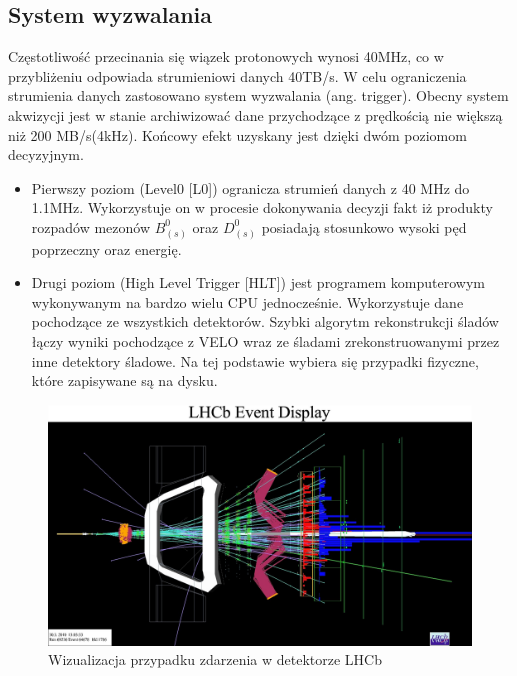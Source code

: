 \subsection{System wyzwalania}
Częstotliwość przecinania się wiązek protonowych wynosi 40MHz, co w przybliżeniu odpowiada strumieniowi danych 40TB/s. W celu ograniczenia strumienia danych zastosowano system wyzwalania (ang. trigger). Obecny system akwizycji jest w stanie archiwizować dane przychodzące z prędkością nie większą niż 200 MB/s(4kHz). Końcowy efekt uzyskany jest dzięki dwóm poziomom decyzyjnym.
\begin{itemize}
 \item Pierwszy poziom (Level0 [L0]) ogranicza  strumień danych z 40 MHz do 1.1MHz. Wykorzystuje on w procesie dokonywania decyzji fakt iż produkty rozpadów mezonów $B_{(s)}^0$ oraz $D_{(s)}^0$ posiadają stosunkowo wysoki pęd poprzeczny oraz energię. 
 \item Drugi poziom (High Level Trigger [HLT]) jest programem komputerowym wykonywanym na bardzo wielu CPU jednocześnie. Wykorzystuje dane pochodzące ze wszystkich detektorów. Szybki algorytm rekonstrukcji śladów łączy wyniki pochodzące z VELO wraz ze śladami zrekonstruowanymi przez inne detektory śladowe. Na tej podstawie wybiera się przypadki fizyczne, które zapisywane są na dysku.  
\end{itemize}
\begin{figure}[ht]
  \centering
  \includegraphics[scale=0.5]{rozdzial2/event.jpg}
  \caption{Wizualizacja przypadku zdarzenia w detektorze LHCb\cite{event}}
  \label{fig:event}
\end{figure}
